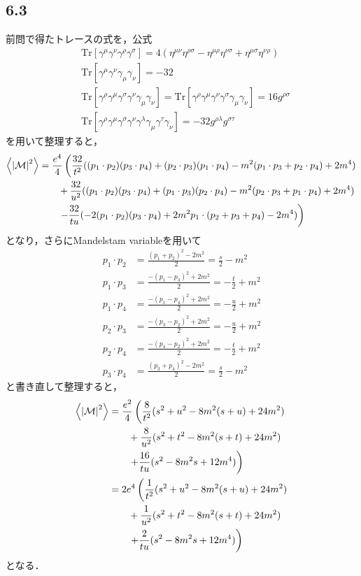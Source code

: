 \subsection*{6.3}
前問で得たトレースの式を，公式
\begin{align}
  &\mathrm{Tr}[\gamma^{\mu}\gamma^{\nu}\gamma^{\rho}\gamma^{\sigma}] = 4(\eta^{\mu\nu}\eta^{\rho\sigma}-\eta^{\mu\rho}\eta^{\nu\sigma} + \eta^{\mu\sigma}\eta^{\nu\rho}) \\
  &\mathrm{Tr}[\gamma^{\mu}\gamma^{\nu}\gamma_{\mu}\gamma_{\nu}] = -32 \\
  &\mathrm{Tr}[\gamma^{\rho}\gamma^{\mu}\gamma^{\sigma}\gamma^{\nu}\gamma_{\mu}\gamma_{\nu}] = \mathrm{Tr}[\gamma^{\rho}\gamma^{\mu}\gamma^{\nu}\gamma^{\sigma}\gamma_{\mu}\gamma_{\nu}] = 16g^{\rho\sigma} \\
  &\mathrm{Tr}[\gamma^{\rho}\gamma^{\mu}\gamma^{\sigma}\gamma^{\nu}\gamma^{\lambda}\gamma_{\mu}\gamma^{\tau}\gamma_{\nu}] = -32g^{\rho\lambda}g^{\sigma\tau} 
\end{align}
を用いて整理すると，
\begin{align}
  \ev{\left|\mathcal{M}\right|^2} &= \frac{e^4}{4} 
    \left(
    \frac{32}{t^2} ((p_1\cdot p_2)(p_3 \cdot p_4) + (p_2 \cdot p_3)(p_1\cdot p_4) - m^2 (p_1 \cdot p_3 + p_2 \cdot p_4) + 2m^4)
    \right.\notag\\
    &\qquad + \frac{32}{u^2} ((p_1\cdot p_2)(p_3 \cdot p_4) + (p_1 \cdot p_3)(p_2\cdot p_4) - m^2 (p_2 \cdot p_3 + p_1 \cdot p_4) + 2m^4) \notag\\
    &\qquad \left.-\frac{32}{tu} (-2(p_1\cdot p_2)(p_3\cdot p_4) + 2m^2 p_1\cdot (p_2 + p_3 + p_4) - 2m^4) \right)
\end{align}  
となり，さらにMandelstam variableを用いて
\begin{align}
  p_1 \cdot p_2 &= \frac{(p_1 + p_2)^2 - 2m^2}{2} = \frac{s}{2} - m^2 \\
  p_1 \cdot p_3 &= \frac{- (p_1 - p_3)^2 + 2m^2}{2} = -\frac{t}{2} + m^2\\
  p_1 \cdot p_4 &= \frac{- (p_1 - p_4)^2 + 2m^2}{2} = -\frac{u}{2} + m^2\\
  p_2 \cdot p_3 &= \frac{- (p_3 - p_2)^2 + 2m^2}{2} = -\frac{u}{2} + m^2\\
  p_2 \cdot p_4 &= \frac{- (p_4 - p_2)^2 + 2m^2}{2} = -\frac{t}{2} + m^2\\
  p_3 \cdot p_4 &= \frac{(p_3 + p_4)^2 - 2m^2}{2} = \frac{s}{2} - m^2 
\end{align}
と書き直して整理すると，
\begin{align}
  \ev{\left|\mathcal{M}\right|^2} &= \frac{e^2}{4} 
    \left(
    \frac{8}{t^2} (s^2 + u^2 - 8m^2(s+u) + 24m^2)
    \right.\notag\\
    &\qquad + \frac{8}{u^2} (s^2 + t^2 -8m^2(s+t) + 24m^2) \notag\\
    &\qquad \left.+\frac{16}{tu} (s^2 - 8m^2s+12m^4) \right) \notag\\
  &= 2 e^4 
  \left(
  \frac{1}{t^2} (s^2 + u^2 - 8m^2(s+u) + 24m^2)
  \right.\notag\\
  &\qquad + \frac{1}{u^2} (s^2 + t^2 -8m^2(s+t) + 24m^2) \notag\\
  &\qquad \left.+\frac{2}{tu} (s^2 - 8m^2s+12m^4) \right)
\end{align}  
となる．

